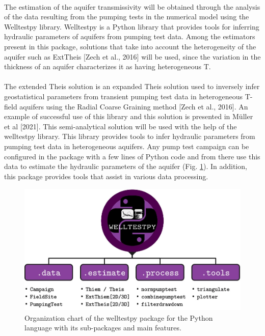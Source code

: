 \documentclass[11pt, a4paper]{article}
\begin{document}
    \paragraph{} %
    The estimation of the aquifer transmissivity will be obtained through the analysis of the data resulting from the pumping tests in the numerical model using the Welltestpy library. Welltestpy is a Python library that provides tools for inferring hydraulic parameters of aquifers from pumping test data. Among the estimators present in this package, solutions that take into account the heterogeneity of the aquifer such as ExtTheis [Zech et al., 2016] will be used, since the variation in the thickness of an aquifer characterizes it as having heterogeneous T.
    \paragraph{} %
    The extended Theis solution is an expanded Theis solution used to inversely infer geostatistical parameters from transient pumping test data in heterogeneous T-field aquifers using the Radial Coarse Graining method [Zech et al., 2016]. An example of successful use of this library and this solution is presented in Müller et al [2021]. This semi-analytical solution will be used with the help of the welltestpy library. This library provides tools to infer hydraulic parameters from pumping test data in heterogeneous aquifers. Any pump test campaign can be configured in the package with a few lines of Python code and from there use this data to estimate the hydraulic parameters of the aquifer (Fig. \ref{fig:welltestpy}). In addition, this package provides tools that assist in various data processing. \\
    
    \begin{figure}[h]
        \centering
        \captionsetup{justification=centering}
        \includegraphics[height=2.5in]{welltestpy.png}
        \caption{Organization chart of the welltestpy package for the Python language with its sub-packages and main features.}
        \label{fig:welltestpy}
    \end{figure}
    
\end{document}
